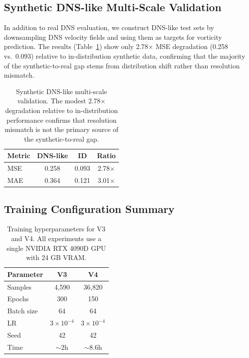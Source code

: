 \documentclass[review]{elsarticle}
\begin{document}
\subsection{Synthetic DNS-like Multi-Scale Validation}
\label{sec:dnslike}

In addition to real DNS evaluation, we construct DNS-like test sets by downsampling DNS velocity fields and using them as targets for vorticity prediction. The results (Table~\ref{tab:dns-like}) show only 2.78$\times$ MSE degradation (0.258 vs.~0.093) relative to in-distribution synthetic data, confirming that the majority of the synthetic-to-real gap stems from distribution shift rather than resolution mismatch.

\begin{table}[t]
\centering
\caption{Synthetic DNS-like multi-scale validation. The modest 2.78$\times$ degradation relative to in-distribution performance confirms that resolution mismatch is not the primary source of the synthetic-to-real gap.}
\label{tab:dns-like}
\begin{tabular}{lccc}
\toprule
Metric & DNS-like & ID & Ratio \\
\midrule
MSE & 0.258 & 0.093 & 2.78$\times$ \\
MAE & 0.364 & 0.121 & 3.01$\times$ \\
\bottomrule
\end{tabular}
\end{table}

\subsection{Training Configuration Summary}
\label{sec:training-conf}

\begin{table}[t]
\centering
\caption{Training hyperparameters for V3 and V4. All experiments use a single NVIDIA RTX 4090D GPU with 24 GB VRAM.}
\label{tab:training}
\begin{tabular}{lcc}
\toprule
Parameter & V3 & V4 \\
\midrule
Samples & 4,590 & 36,820 \\
Epochs & 300 & 150 \\
Batch size & 64 & 64 \\
LR & $3\times10^{-4}$ & $3\times10^{-4}$ \\
Seed & 42 & 42 \\
Time & $\sim$2h & $\sim$8.6h \\
\bottomrule
\end{tabular}
\end{table}
\end{document}
